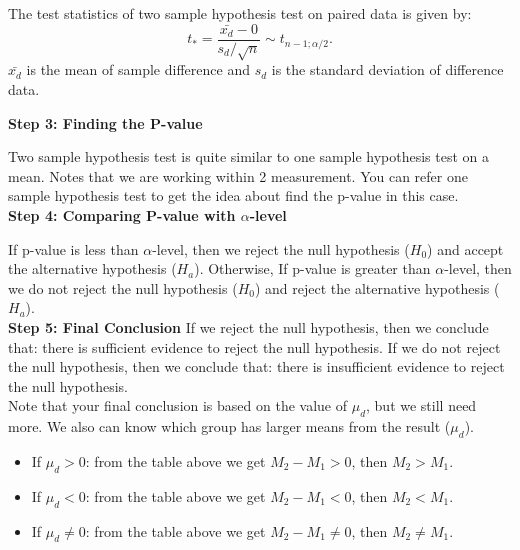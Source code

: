 \begin{definition}
The test statistics of two sample hypothesis test on paired data is given by: \[ t_* = \frac{\bar{x_d}-0}{s_d / \sqrt{n}} \sim t_{n-1;\alpha/2}.\]
$\bar{x_d}$ is the mean of sample difference and $s_d$ is the standard deviation of difference data.
\end{definition}

\textbf{Step 3: Finding the P-value}

Two sample hypothesis test is quite similar to one sample hypothesis test on a mean. Notes that we are working within 2 measurement. You can refer one sample hypothesis test to get the idea about find the p-value in this case.\\

\textbf{Step 4: Comparing P-value with $\alpha$-level}

If p-value is less than $\alpha$-level, then we reject the null hypothesis ($H_0$) and accept the alternative hypothesis ($H_a$). Otherwise, If p-value is greater than $\alpha$-level, then we do not reject the null hypothesis ($H_0$) and reject the alternative hypothesis ($H_a$).\\

\textbf{Step 5: Final Conclusion}
If we reject the null hypothesis, then we conclude that: there is sufficient evidence to reject the null hypothesis. If we do not reject the null hypothesis, then we conclude that: there is insufficient evidence to reject the null hypothesis.\\

Note that your final conclusion is based on the value of $\mu_d$, but we still need more. We also can know which group has larger means from the result ($\mu_d$).

\begin{itemize}
	\item If $\mu_d > 0$: from the table above we get $M_2-M_1 >0$, then $M_2 > M_1$.
	\item If $\mu_d < 0$: from the table above we get $M_2-M_1 <0$, then $M_2 < M_1$.
	\item If $\mu_d \neq 0$: from the table above we get $M_2-M_1 \neq 0$, then $M_2 \neq M_1$.
\end{itemize}

